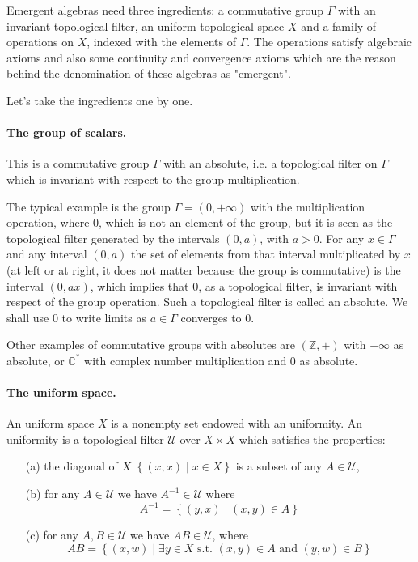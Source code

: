 \documentclass{article}
\begin{document}
Emergent algebras need three ingredients: a commutative group $\displaystyle \Gamma$ with an invariant topological filter, 
an uniform topological space $\displaystyle X$ and a family of operations on $\displaystyle X$, indexed with the elements of $\displaystyle \Gamma$.  The operations satisfy algebraic axioms and also some continuity and convergence axioms which are the reason behind the denomination of these algebras as "emergent". 

Let's take the ingredients one by one. 


\paragraph{The group of scalars.} This is a commutative group $\displaystyle \Gamma$ with an absolute, i.e. a topological filter on $\displaystyle \Gamma$ which is invariant with respect to the group multiplication. 

 The typical example is the group $\displaystyle \Gamma = (0,+\infty)$ with the  multiplication operation, where $\displaystyle 0$, which is not an element of the group, but it is seen as the topological filter generated by the intervals $\displaystyle (0,a)$, with $\displaystyle a >0$. 
For any $\displaystyle x \in \Gamma$ and any interval $\displaystyle (0,a)$ the set of elements from that interval multiplicated by $\displaystyle x$ (at left or at right, it does not matter because the group is commutative) is the interval $\displaystyle (0,ax)$, which implies that $\displaystyle 0$, as a topological filter, is invariant with respect of the group operation. Such a topological filter is called an absolute. We shall use $\displaystyle 0$ to write limits as $\displaystyle a \in \Gamma$ converges to $\displaystyle 0$. 

Other examples of commutative groups with absolutes are $\displaystyle (\mathbb{Z},+)$ with $\displaystyle +\infty$ as absolute, or $\displaystyle \mathbb{C}^{*}$  with complex number multiplication and $\displaystyle 0$ as absolute. 

\paragraph{The uniform space.} An uniform space $\displaystyle X$ is a nonempty set endowed with an uniformity. An uniformity is a topological filter $\displaystyle \mathcal{U}$ over $\displaystyle X \times X$ which satisfies the properties: 
\begin{enumerate}
  \item[(a)] the diagonal of $\displaystyle X$ $\displaystyle \left\{ (x,x) \mid x \in X \right\}$  is a subset of any $\displaystyle A \in \mathcal{U}$, 
  \item[(b)] for any $\displaystyle A \in \mathcal{U}$ we have $\displaystyle A^{-1} \in \mathcal{U}$ where $$\displaystyle A^{-1} = \left\{  (y,x) \mid (x,y) \in A \right\}$$
  \item[(c)] for any $\displaystyle A,B \in \mathcal{U}$ we have $\displaystyle AB \in \mathcal{U}$, where  $$\displaystyle AB = \left\{ (x,w) \mid \exists y \in X \mbox{ s.t. } (x,y) \in A \mbox{ and } (y,w) \in B \right\}$$
\end{enumerate}
\end{document}
